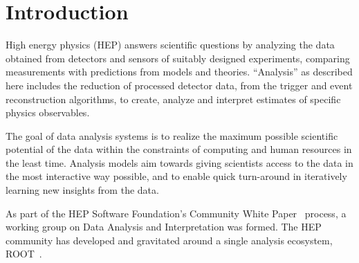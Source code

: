 \section{Introduction}

High energy physics (HEP) answers scientific questions by analyzing the data obtained from detectors and sensors of suitably designed experiments, comparing measurements with predictions from models and theories. ``Analysis'' as described here includes the reduction of processed detector data, from the trigger and event reconstruction algorithms, to create, analyze and interpret estimates of specific physics observables.

The goal of data analysis systems is to realize the maximum possible scientific potential of the data within the constraints of computing and human resources in the least time. Analysis models aim towards giving scientists access to the data in the most interactive way possible, and to enable quick turn-around in iteratively learning new insights from the data.

As part of the HEP Software Foundation's Community White Paper~\cite{HSF-CWP-2017-01} process, a working group on Data Analysis and Interpretation was formed. The HEP community has developed and gravitated around a single analysis ecosystem, ROOT~\cite{Brun1996}.
